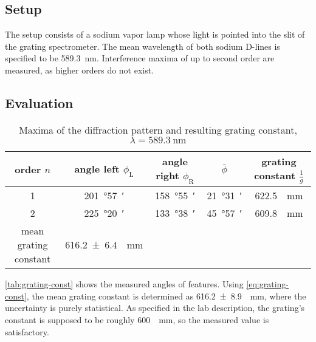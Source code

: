 \subsection{Setup}
The setup consists of a sodium vapor lamp whose light is pointed into the slit of the grating spectrometer.
The mean wavelength of both sodium D-lines is specified to be \SI{589.3}{\nm}.
Interference maxima of up to second order are measured, as higher orders do not exist.

\subsection{Evaluation}
\begin{table}[b!]
	\centering
	\caption[Maxima of the diffraction pattern and resulting grating constant]{Maxima of the diffraction pattern and resulting grating constant, $\lambda=\SI{589.3}{\nm}$}
	\label{tab:grating-const}
	\begin{tabular}{S|SSS|S}
		\toprule
		{order $n$}	&	{angle left $\phi_\text{L}$}	&	{angle right $\phi_\text{R}$}	&	{$\overline{\phi}$}	&	{grating constant $\frac{1}{g}$}\\
			&	\SI{201}{\degree}\SI{57}{\arcminute}	&	\SI{158}{\degree}\SI{55}{\arcminute}	&	\SI{21}{\degree}\SI{31}{\arcminute}	&	\SI{622.5}{\per\mm}	\\
			2	&	\SI{225}{\degree}\SI{20}{\arcminute}	&	\SI{133}{\degree}\SI{38}{\arcminute}	&	\SI{45}{\degree}\SI{57}{\arcminute}	&	\SI{609.8}{\per\mm}	\\
		\midrule
		{mean grating constant}	&	\SI{616.2(64)}{\per\mm}\\
		\bottomrule
	\end{tabular}
\end{table}

\autoref{tab:grating-const} shows the measured angles of features.
Using \autoref{eq:grating-const}, the mean grating constant is determined as \SI{616.2(89)}{\per\mm}, where the uncertainty is purely statistical.
As specified in the lab description, the grating's constant is supposed to be roughly \SI{600}{\per\mm}, so the measured value is satisfactory.


